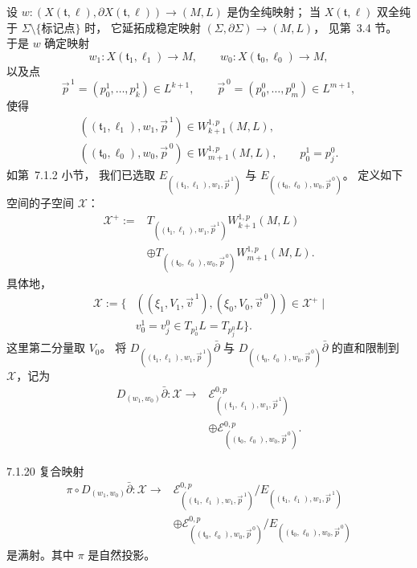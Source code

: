 设
$w\colon(X(\mathfrak t,\ell),\partial X(\mathfrak t,\ell))
\to(M,L)$ 是伪全纯映射；
当 $X(\mathfrak t,\ell)$ 双全纯于
$\Sigma\setminus\{\text{标记点}\}$ 时，
它延拓成稳定映射
$(\Sigma,\partial\Sigma)\to(M,L)$，
见第~3.4 节。
于是 $w$ 确定映射
\[
w_1\colon X(\mathfrak t_1,\ell_1)\to M,
\qquad
w_0\colon X(\mathfrak t_0,\ell_0)\to M,
\]
以及点
\[
\vec p^{\,1}=(p_0^1,\ldots,p_k^1)\in L^{k+1},
\qquad
\vec p^{\,0}=(p_0^0,\ldots,p_m^0)\in L^{m+1},
\]
使得
\[
\begin{gathered}
((\mathfrak t_1,\ell_1),w_1,\vec p^{\,1})
 \in W_{k+1}^{1,p}(M,L),\\
((\mathfrak t_0,\ell_0),w_0,\vec p^{\,0})
 \in W_{m+1}^{1,p}(M,L),
\qquad p_0^1=p_j^0.
\end{gathered}
\]
如第~7.1.2 小节，
我们已选取
$E_{((\mathfrak t_1,\ell_1),w_1,\vec p^{\,1})}$
与
$E_{((\mathfrak t_0,\ell_0),w_0,\vec p^{\,0})}$。
定义如下空间的子空间 $\mathcal X$：
\begin{equation}
\begin{aligned}
\mathcal X^+:={}&
T_{((\mathfrak t_1,\ell_1),w_1,\vec p^{\,1})}
 W_{k+1}^{1,p}(M,L)\\
&\oplus
T_{((\mathfrak t_0,\ell_0),w_0,\vec p^{\,0})}
 W_{m+1}^{1,p}(M,L).
\end{aligned}
\tag{7.1.19.1}\label{eq:7-1-19-1}
\end{equation}
具体地，
\begin{equation}
\begin{aligned}
\mathcal X:=\bigl\{&((\xi_1,V_1,\vec v^{\,1}),
 (\xi_0,V_0,\vec v^{\,0}))\in\mathcal X^+\;\big|\\
&v_0^1=v_j^0\in T_{p_0^1}L=T_{p_j^0}L\bigr\}.
\end{aligned}
\tag{7.1.19.2}\label{eq:7-1-19-2}
\end{equation}
这里第二分量取 $V_0$。
将
$D_{((\mathfrak t_1,\ell_1),w_1,\vec p^{\,1})}\bar\partial$
与
$D_{((\mathfrak t_0,\ell_0),w_0,\vec p^{\,0})}\bar\partial$
的直和限制到 $\mathcal X$，记为
\[
\begin{aligned}
D_{(w_1,w_0)}\bar\partial\colon\mathcal X
\longrightarrow{}&
\mathcal E^{0,p}_{((\mathfrak t_1,\ell_1),w_1,\vec p^{\,1})}\\
&\oplus
\mathcal E^{0,p}_{((\mathfrak t_0,\ell_0),w_0,\vec p^{\,0})}.
\end{aligned}
\]

\begin{lemma}{7.1.20}\label{lem:7-1-20}
复合映射
\[
\begin{aligned}
\pi\circ D_{(w_1,w_0)}\bar\partial\colon\mathcal X
\longrightarrow{}&
\mathcal E^{0,p}_{((\mathfrak t_1,\ell_1),w_1,\vec p^{\,1})}
 /E_{((\mathfrak t_1,\ell_1),w_1,\vec p^{\,1})}\\
&\oplus
\mathcal E^{0,p}_{((\mathfrak t_0,\ell_0),w_0,\vec p^{\,0})}
 /E_{((\mathfrak t_0,\ell_0),w_0,\vec p^{\,0})}
\end{aligned}
\]
是满射。其中 $\pi$ 是自然投影。
\end{lemma}

